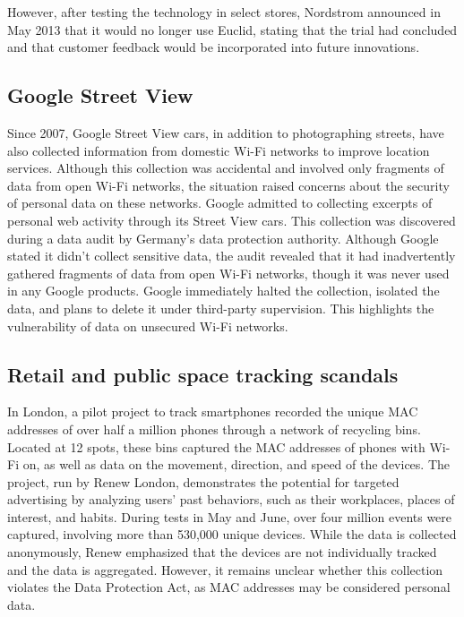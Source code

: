 \documentclass{article}
\begin{document}
  However, after testing the technology in select stores, Nordstrom announced in May 2013 
  that it would no longer use Euclid, stating that the trial had concluded and that 
  customer feedback would be incorporated into future innovations.\cite{Nordstrom2013}


  \subsection{\label{subsec:Google}Google Street View}
  Since 2007, Google Street View cars, in addition to photographing streets,
have also collected information from domestic Wi-Fi networks to improve location
services. Although this collection was accidental and involved only fragments of
data from open Wi-Fi networks, the situation raised concerns about the security
of personal data on these networks. Google admitted to collecting excerpts of personal
web activity through its Street View cars. This collection was discovered during
a data audit by Germany's data protection authority. Although Google stated it didn't
collect sensitive data, the audit revealed that it had inadvertently gathered fragments
of data from open Wi-Fi networks, though it was never used in any Google products.
Google immediately halted the collection, isolated the data, and plans to delete it
under third-party supervision. This highlights the vulnerability of data on unsecured
Wi-Fi networks.\cite{Google2007}

  \subsection{\label{subsec:London}Retail and public space tracking scandals}
  In London, a pilot project to track smartphones recorded the unique MAC addresses
of over half a million phones through a network of recycling bins. Located at 12 spots,
these bins captured the MAC addresses of phones with Wi-Fi on, as well as data on the
movement, direction, and speed of the devices. The project, run by Renew London, demonstrates
the potential for targeted advertising by analyzing users' past behaviors, such as their
workplaces, places of interest, and habits. During tests in May and June, over four million
events were captured, involving more than 530,000 unique devices. While the data is collected
anonymously, Renew emphasized that the devices are not individually tracked and the data
is aggregated. However, it remains unclear whether this collection violates the Data Protection
Act, as MAC addresses may be considered personal data.\cite{RenewLondon2013}
\end{document}
